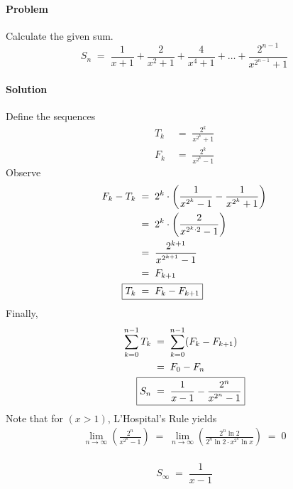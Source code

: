 \documentclass[a4paper, 11pt, reqno]{article}
\newcounter{prob}
\def\problem{\stepcounter{prob}\paragraph{Problem \arabic{prob}}}
\def\solution{\paragraph{Solution}}
\begin{document}
	\problem
	Calculate the given sum.
	\begin{equation*}
		S_n  \;=\;  \frac{1}{x + 1} + \frac{2}{x^2 + 1} + \frac{4}{x^4 + 1} + \dots + \frac{2^{n-1}}{x^{2^{n-1}} + 1} 
	\end{equation*}
	\solution
	Define the sequences
	\begin{align*}
		T_k \; &= \; \frac{2^k}{x^{2^{k}} + 1} \\
		F_k \; &= \; \frac{2^k}{x^{2^{k}} - 1}
	\end{align*}
	Observe
	\begin{align*}
		F_k - T_k 	\; &= \; 2^k\cdot \left( \frac{1}{x^{2^{k}} - 1} - \frac{1}{x^{2^{k}} + 1} \right) \\
				\; &= \; 2^k\cdot \left( \frac{2}{x^{2^{k}\cdot 2} - 1}  \right) \\
				\; &= \; \frac{2^{k+1}}{x^{2^{k+1}} - 1} \\
				\; &= \; F_{k + 1} \\
		\Aboxed{ T_k \; &= \; F_k - F_{k + 1} }
	\end{align*}
	Finally,
	\begin{align*}
		\sum_{k=0}^{n-1} T_k
		 	\; &= \; \sum_{k=0}^{n-1} (F_{k} - F_{k+1}) \\
			\; &= \; F_0 - F_n \\
		\Aboxed{ S_n	\; &= \; \frac{1}{x - 1} - \frac{2^n}{x^{2^{n}} - 1} }
	\end{align*}
	Note that for $(x > 1)$, L'Hospital's Rule yields
	\begin{align*}
		\lim_{n \to \infty} \left( \frac{2^n}{x^{2^{n}} - 1} \right)
			\; = \;  \lim_{n \to \infty} \left( \frac{2^n\ln{2}}{2^n \ln{2}\cdot x^{2^n}\ln{x}} \right)
			\; = \;  0 
	\end{align*}\\
	\begin{equation*}
		\boxed{ S_\infty \; = \; \frac{1}{x - 1} } \tag{$x > 1$} 
	\end{equation*}
\end{document}
